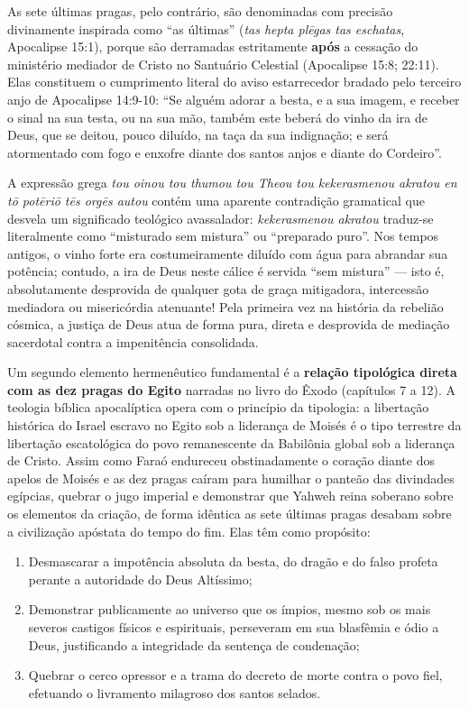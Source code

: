 As sete últimas pragas, pelo contrário, são denominadas com precisão divinamente inspirada como ``as últimas'' (\textit{tas hepta plēgas tas eschatas}, Apocalipse 15:1), porque são derramadas estritamente \textbf{após} a cessação do ministério mediador de Cristo no Santuário Celestial (Apocalipse 15:8; 22:11). Elas constituem o cumprimento literal do aviso estarrecedor bradado pelo terceiro anjo de Apocalipse 14:9-10:
``Se alguém adorar a besta, e a sua imagem, e receber o sinal na sua testa, ou na sua mão, também este beberá do vinho da ira de Deus, que se deitou, pouco diluído, na taça da sua indignação; e será atormentado com fogo e enxofre diante dos santos anjos e diante do Cordeiro''.

A expressão grega \textit{tou oinou tou thumou tou Theou tou kekerasmenou akratou en tō potēriō tēs orgēs autou} contém uma aparente contradição gramatical que desvela um significado teológico avassalador: \textit{kekerasmenou akratou} traduz-se literalmente como ``misturado sem mistura'' ou ``preparado puro''. Nos tempos antigos, o vinho forte era costumeiramente diluído com água para abrandar sua potência; contudo, a ira de Deus neste cálice é servida ``sem mistura'' — isto é, absolutamente desprovida de qualquer gota de graça mitigadora, intercessão mediadora ou misericórdia atenuante! Pela primeira vez na história da rebelião cósmica, a justiça de Deus atua de forma pura, direta e desprovida de mediação sacerdotal contra a impenitência consolidada.

Um segundo elemento hermenêutico fundamental é a \textbf{relação tipológica direta com as dez pragas do Egito} narradas no livro do Êxodo (capítulos 7 a 12). A teologia bíblica apocalíptica opera com o princípio da tipologia: a libertação histórica do Israel escravo no Egito sob a liderança de Moisés é o tipo terrestre da libertação escatológica do povo remanescente da Babilônia global sob a liderança de Cristo.
Assim como Faraó endureceu obstinadamente o coração diante dos apelos de Moisés e as dez pragas caíram para humilhar o panteão das divindades egípcias, quebrar o jugo imperial e demonstrar que Yahweh reina soberano sobre os elementos da criação, de forma idêntica as sete últimas pragas desabam sobre a civilização apóstata do tempo do fim. Elas têm como propósito:
\begin{enumerate}
  \item Desmascarar a impotência absoluta da besta, do dragão e do falso profeta perante a autoridade do Deus Altíssimo;
  \item Demonstrar publicamente ao universo que os ímpios, mesmo sob os mais severos castigos físicos e espirituais, perseveram em sua blasfêmia e ódio a Deus, justificando a integridade da sentença de condenação;
  \item Quebrar o cerco opressor e a trama do decreto de morte contra o povo fiel, efetuando o livramento milagroso dos santos selados.
\end{enumerate}



